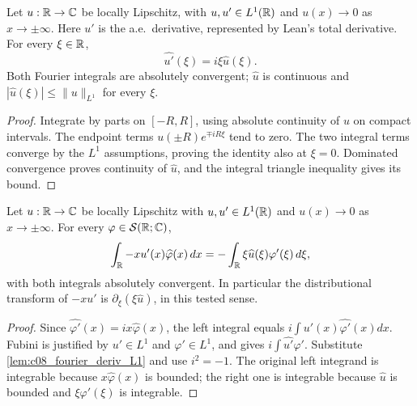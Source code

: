 \begin{lemma}
  \label{lem:c08_fourier_deriv_L1}
  Let $u:\mathbb{R}\to\mathbb{C}$ be locally Lipschitz, with $u,u'\in L^1(\mathbb{R})$ and
  $u(x)\to0$ as $x\to\pm\infty$. Here $u'$ is the a.e.\ derivative, represented by Lean's total
  derivative. For every $\xi\in\mathbb{R}$,
  \[
    \widehat{u'}(\xi)=i\xi\widehat u(\xi).
  \]
  Both Fourier integrals are absolutely convergent; $\widehat u$ is continuous and
  $|\widehat u(\xi)|\le\|u\|_{L^1}$ for every $\xi$.
\end{lemma}
\begin{proof}
  Integrate by parts on $[-R,R]$, using absolute continuity of $u$ on compact intervals.
  The endpoint terms $u(\pm R)e^{\mp iR\xi}$ tend to zero. The two integral terms converge by the
  $L^1$ assumptions, proving the identity also at $\xi=0$. Dominated convergence proves continuity
  of $\widehat u$, and the integral triangle inequality gives its bound.
\end{proof}

\begin{lemma}
  \label{lem:c08_drift_test_transform}
  Let $u:\mathbb{R}\to\mathbb{C}$ be locally Lipschitz with $u,u'\in L^1(\mathbb{R})$ and $u(x)\to0$ as $x\to\pm\infty$.
  For every $\varphi\in\mathcal S(\mathbb{R};\mathbb{C})$,
  \[
    \int_{\mathbb{R}} -x u'(x)\widehat\varphi(x)\,dx
      =-\int_{\mathbb{R}} \xi\widehat u(\xi)\varphi'(\xi)\,d\xi,
  \]
  with both integrals absolutely convergent. In particular the distributional transform of
  $-xu'$ is $\partial_\xi(\xi\widehat u)$, in this tested sense.
\end{lemma}
\begin{proof}
  Since $\widehat{\varphi'}(x)=ix\widehat\varphi(x)$, the left integral equals
  $i\int u'(x)\widehat{\varphi'}(x)dx$. Fubini is justified by
  $u'\in L^1$ and $\varphi'\in L^1$, and gives $i\int\widehat{u'}\varphi'$.
  Substitute \cref{lem:c08_fourier_deriv_L1} and use $i^2=-1$.
  The original left integrand is integrable because $x\widehat\varphi(x)$ is bounded; the right one
  is integrable because $\widehat u$ is bounded and $\xi\varphi'(\xi)$ is integrable.
\end{proof}

